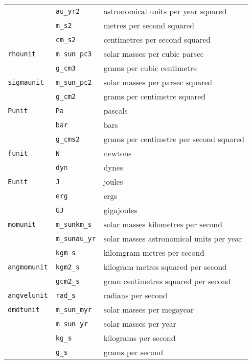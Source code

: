 \documentclass[a4paper]{article}
\newcommand{\var}[1]{\texttt{#1}}
\begin{document}
\begin{center}
\begin{supertabular}{|p{3cm}|p{3cm}|p{6cm}|}
                & \var{au\_yr2}   & astronomical units per year squared \\
                & \var{m\_s2}     & metres per second squared \\
                & \var{cm\_s2}    & centimetres per second squared \\ \hline
\var{rhounit}   & \var{m\_sun\_pc3} & solar masses per cubic parsec \\
                & \var{g\_cm3}     & grams per cubic centimetre \\ \hline
\var{sigmaunit} & \var{m\_sun\_pc2} & solar masses per parsec squared \\
                & \var{g\_cm2}     & grams per centimetre squared \\ \hline
\var{Punit}     & \var{Pa}        & pascals \\
                & \var{bar}       & bars \\
                & \var{g\_cms2}    & grams per centimetre per second squared \\
\hline
\var{funit}     & \var{N}         & newtons  \\ 
                & \var{dyn}       & dynes    \\ \hline
\var{Eunit}     & \var{J}         & joules \\
                & \var{erg}       & ergs \\
                & \var{GJ}        & gigajoules \\ \hline
\var{momunit}   & \var{m\_sunkm\_s} & solar masses kilometres per second \\
                & \var{m\_sunau\_yr}& solar masses astronomical units per year \\
                & \var{kgm\_s}    & kilomgram metres per second \\
\hline
\var{angmomunit}& \var{kgm2\_s}  & kilogram metres squared per second \\
                & \var{gcm2\_s}   & gram centimetres squared per second \\ 
\hline
\var{angvelunit}& \var{rad\_s}   & radians per second \\
\hline
\var{dmdtunit}  & \var{m\_sun\_myr} & solar masses per megayear \\
                & \var{m\_sun\_yr}  & solar masses per year \\
                & \var{kg\_s}       & kilograms per second \\
                & \var{g\_s}        & grams per second \\ \hline

\end{supertabular}
\end{center}
\end{document}
